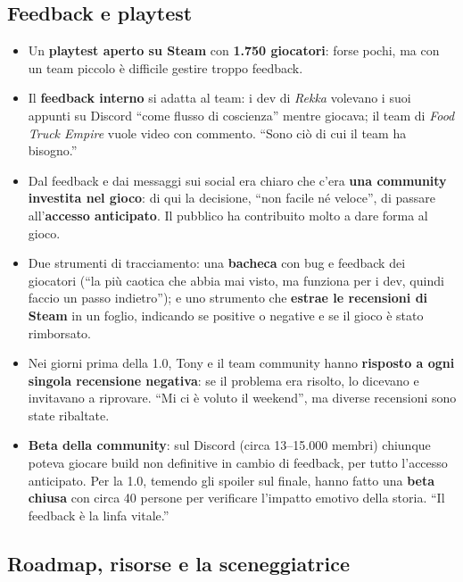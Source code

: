 \subsection{Feedback e playtest}

\begin{itemize}
  \item Un \textbf{playtest aperto su Steam} con \textbf{1.750 giocatori}: forse
        pochi, ma con un team piccolo è difficile gestire troppo feedback.
  \item Il \textbf{feedback interno} si adatta al team: i dev di \emph{Rekka}
        volevano i suoi appunti su Discord ``come flusso di coscienza'' mentre
        giocava; il team di \emph{Food Truck Empire} vuole video con commento.
        ``Sono ciò di cui il team ha bisogno.''
  \item Dal feedback e dai messaggi sui social era chiaro che c'era \textbf{una
        community investita nel gioco}: di qui la decisione, ``non facile né
        veloce'', di passare all'\textbf{accesso anticipato}. Il pubblico ha
        contribuito molto a dare forma al gioco.
  \item Due strumenti di tracciamento: una \textbf{bacheca} con bug e feedback dei
        giocatori (``la più caotica che abbia mai visto, ma funziona per i dev,
        quindi faccio un passo indietro''); e uno strumento che \textbf{estrae le
        recensioni di Steam} in un foglio, indicando se positive o negative e se
        il gioco è stato rimborsato.
  \item Nei giorni prima della 1.0, Tony e il team community hanno
        \textbf{risposto a ogni singola recensione negativa}: se il problema era
        risolto, lo dicevano e invitavano a riprovare. ``Mi ci è voluto il
        weekend'', ma diverse recensioni sono state ribaltate.
  \item \textbf{Beta della community}: sul Discord (circa 13--15.000 membri)
        chiunque poteva giocare build non definitive in cambio di feedback, per
        tutto l'accesso anticipato. Per la 1.0, temendo gli spoiler sul finale,
        hanno fatto una \textbf{beta chiusa} con circa 40 persone per verificare
        l'impatto emotivo della storia. ``Il feedback è la linfa vitale.''
\end{itemize}

\subsection{Roadmap, risorse e la sceneggiatrice}

